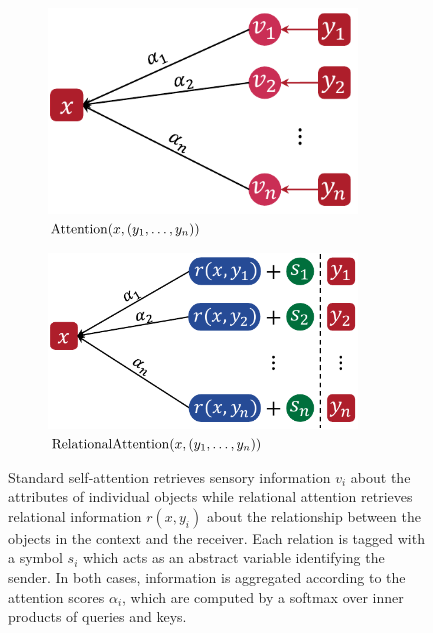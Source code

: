 \begin{figure}[t]
  \centering
  \begin{subfigure}[t]{0.415384615\textwidth} %
    \centering
    \includegraphics[width=0.9\textwidth]{figs/sensory_retrieval.pdf} %
    \caption{$\mathrm{Attention}(x, (y_1, \ldots, y_n))$}%
  \end{subfigure}
  \qquad
  \begin{subfigure}[t]{0.484615385\textwidth} %
    \centering
    \includegraphics[width=0.9\textwidth]{figs/relational_retrieval.pdf} %
    \caption{$\mathrm{RelationalAttention}(x, (y_1, \ldots, y_n))$}%
  \end{subfigure}
  \caption{Standard self-attention retrieves sensory information $v_i$ about the attributes of individual objects while relational attention retrieves relational information $r(x, y_i)$ about the relationship between the objects in the context and the receiver.
  Each relation is tagged with a symbol $s_i$ which acts as an abstract variable identifying the sender.
  In both cases, information is aggregated according to the attention scores $\alpha_i$, which are computed by a softmax over inner products of queries and keys.
  }\label{fig:selfattn_relattn}
  \vskip-7pt
\end{figure}

